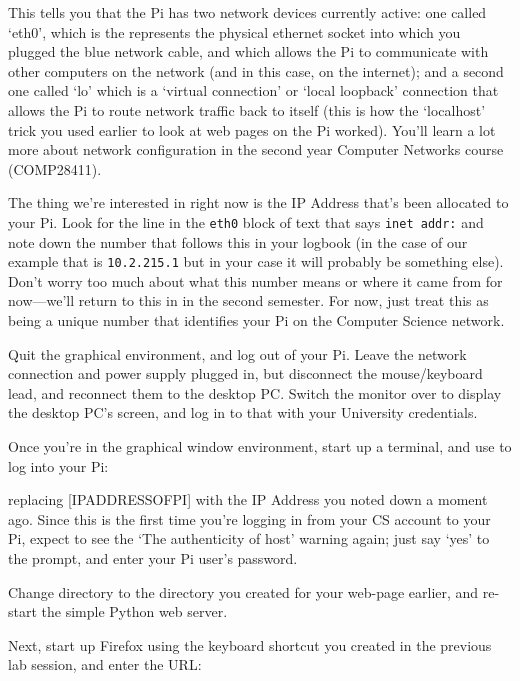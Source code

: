 This tells you that the Pi has two network devices currently active: one called `eth0', which is the represents the physical ethernet socket into which you plugged the blue network cable, and which allows the Pi to communicate with other computers on the network (and in this case, on the internet); and a second one called `lo' which is a `virtual connection' or `local loopback' connection that allows the Pi to route network traffic back to itself (this is how the `localhost' trick you used earlier to look at web pages on the Pi worked). You'll learn a lot more about network configuration in the second year Computer Networks course (COMP28411). 

The thing we're interested in right now is the IP Address that's been allocated to your Pi. Look for the line in the \texttt{eth0} block of text that says \texttt{inet addr:} and note down the number that follows this in your logbook (in the case of our example that is \texttt{10.2.215.1} but in your case it will probably be something else). Don't worry too much about what this number means or where it came from for now---we'll return to this in  in the second semester. For now, just treat this as being a unique number that identifies your Pi on the Computer Science network. 

Quit the graphical environment, and log out of your Pi. Leave the network connection and power supply plugged in, but disconnect the mouse/keyboard lead, and reconnect them to the desktop PC. Switch the monitor over to display the desktop PC's screen, and log in to that with your University credentials. 

Once you're in the graphical window environment, start up a terminal, and use  to log into your Pi:


replacing [IPADDRESSOFPI] with the IP Address you noted down a moment ago. Since this is the first time you're logging in from your CS account to your Pi, expect to see the `The authenticity of host' warning again; just say `yes' to the prompt, and enter your Pi user's password. 

Change directory to the  directory you created for your web-page earlier, and re-start the simple Python web server. 

Next, start up Firefox using the keyboard shortcut you created in the previous lab session, and enter the URL:

